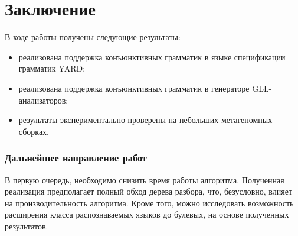 \section*{Заключение}
В ходе работы получены следующие результаты:
\begin{itemize}
    \item реализована поддержка конъюнктивных грамматик в языке спецификации грамматик YARD;
    \item реализована поддержка конъюнктивных грамматик в генераторе GLL-анализаторов;
    \item результаты экспериментально проверены на небольших метагеномных сборках.
\end{itemize}

\subsubsection*{Дальнейшее направление работ}

В первую очередь, необходимо снизить время работы алгоритма. Полученная реализация предполагает полный обход дерева разбора, что, безусловно, влияет на производительность алгоритма. Кроме того, можно исследовать возможность расширения класса распознаваемых языков до булевых, на основе полученных результатов.

